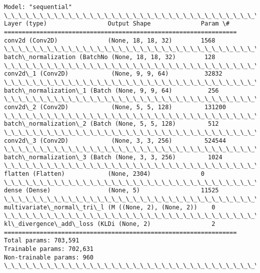 \documentclass[11pt]{article}
\begin{document}
    \begin{Verbatim}[commandchars=\\\{\}]
Model: "sequential"
\_\_\_\_\_\_\_\_\_\_\_\_\_\_\_\_\_\_\_\_\_\_\_\_\_\_\_\_\_\_\_\_\_\_\_\_\_\_\_\_\_\_\_\_\_\_\_\_\_\_\_\_\_\_\_\_\_\_\_\_\_\_\_\_\_
Layer (type)                 Output Shape              Param \#
=================================================================
conv2d (Conv2D)              (None, 18, 18, 32)        1568
\_\_\_\_\_\_\_\_\_\_\_\_\_\_\_\_\_\_\_\_\_\_\_\_\_\_\_\_\_\_\_\_\_\_\_\_\_\_\_\_\_\_\_\_\_\_\_\_\_\_\_\_\_\_\_\_\_\_\_\_\_\_\_\_\_
batch\_normalization (BatchNo (None, 18, 18, 32)        128
\_\_\_\_\_\_\_\_\_\_\_\_\_\_\_\_\_\_\_\_\_\_\_\_\_\_\_\_\_\_\_\_\_\_\_\_\_\_\_\_\_\_\_\_\_\_\_\_\_\_\_\_\_\_\_\_\_\_\_\_\_\_\_\_\_
conv2d\_1 (Conv2D)            (None, 9, 9, 64)          32832
\_\_\_\_\_\_\_\_\_\_\_\_\_\_\_\_\_\_\_\_\_\_\_\_\_\_\_\_\_\_\_\_\_\_\_\_\_\_\_\_\_\_\_\_\_\_\_\_\_\_\_\_\_\_\_\_\_\_\_\_\_\_\_\_\_
batch\_normalization\_1 (Batch (None, 9, 9, 64)          256
\_\_\_\_\_\_\_\_\_\_\_\_\_\_\_\_\_\_\_\_\_\_\_\_\_\_\_\_\_\_\_\_\_\_\_\_\_\_\_\_\_\_\_\_\_\_\_\_\_\_\_\_\_\_\_\_\_\_\_\_\_\_\_\_\_
conv2d\_2 (Conv2D)            (None, 5, 5, 128)         131200
\_\_\_\_\_\_\_\_\_\_\_\_\_\_\_\_\_\_\_\_\_\_\_\_\_\_\_\_\_\_\_\_\_\_\_\_\_\_\_\_\_\_\_\_\_\_\_\_\_\_\_\_\_\_\_\_\_\_\_\_\_\_\_\_\_
batch\_normalization\_2 (Batch (None, 5, 5, 128)         512
\_\_\_\_\_\_\_\_\_\_\_\_\_\_\_\_\_\_\_\_\_\_\_\_\_\_\_\_\_\_\_\_\_\_\_\_\_\_\_\_\_\_\_\_\_\_\_\_\_\_\_\_\_\_\_\_\_\_\_\_\_\_\_\_\_
conv2d\_3 (Conv2D)            (None, 3, 3, 256)         524544
\_\_\_\_\_\_\_\_\_\_\_\_\_\_\_\_\_\_\_\_\_\_\_\_\_\_\_\_\_\_\_\_\_\_\_\_\_\_\_\_\_\_\_\_\_\_\_\_\_\_\_\_\_\_\_\_\_\_\_\_\_\_\_\_\_
batch\_normalization\_3 (Batch (None, 3, 3, 256)         1024
\_\_\_\_\_\_\_\_\_\_\_\_\_\_\_\_\_\_\_\_\_\_\_\_\_\_\_\_\_\_\_\_\_\_\_\_\_\_\_\_\_\_\_\_\_\_\_\_\_\_\_\_\_\_\_\_\_\_\_\_\_\_\_\_\_
flatten (Flatten)            (None, 2304)              0
\_\_\_\_\_\_\_\_\_\_\_\_\_\_\_\_\_\_\_\_\_\_\_\_\_\_\_\_\_\_\_\_\_\_\_\_\_\_\_\_\_\_\_\_\_\_\_\_\_\_\_\_\_\_\_\_\_\_\_\_\_\_\_\_\_
dense (Dense)                (None, 5)                 11525
\_\_\_\_\_\_\_\_\_\_\_\_\_\_\_\_\_\_\_\_\_\_\_\_\_\_\_\_\_\_\_\_\_\_\_\_\_\_\_\_\_\_\_\_\_\_\_\_\_\_\_\_\_\_\_\_\_\_\_\_\_\_\_\_\_
multivariate\_normal\_tri\_l (M ((None, 2), (None, 2))    0
\_\_\_\_\_\_\_\_\_\_\_\_\_\_\_\_\_\_\_\_\_\_\_\_\_\_\_\_\_\_\_\_\_\_\_\_\_\_\_\_\_\_\_\_\_\_\_\_\_\_\_\_\_\_\_\_\_\_\_\_\_\_\_\_\_
kl\_divergence\_add\_loss (KLDi (None, 2)                 2
=================================================================
Total params: 703,591
Trainable params: 702,631
Non-trainable params: 960
\_\_\_\_\_\_\_\_\_\_\_\_\_\_\_\_\_\_\_\_\_\_\_\_\_\_\_\_\_\_\_\_\_\_\_\_\_\_\_\_\_\_\_\_\_\_\_\_\_\_\_\_\_\_\_\_\_\_\_\_\_\_\_\_\_
\end{Verbatim}
\end{document}
